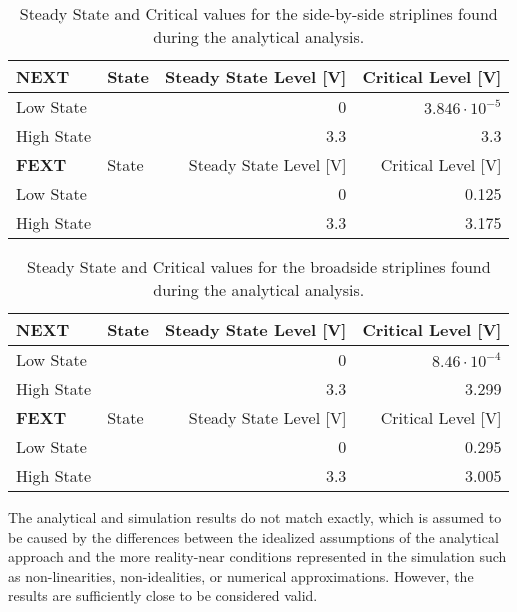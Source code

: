 \documentclass[../main.tex]{subfiles}
\begin{document}
\begin{table}[h]
    \centering
    \begin{tabular}{l l|r r}
        \toprule[1pt]
        \textbf{NEXT} & State & Steady State Level [V] & Critical Level [V] \\
        \midrule
        Low State & & 0 & $3.846 \cdot 10^{-5}$\\
        High State & & 3.3 & 3.3\\
        \midrule[1pt]
        \textbf{FEXT} & State & Steady State Level [V] & Critical Level [V] \\
        \midrule
        Low State & & 0 & 0.125\\
        High State & & 3.3 & 3.175\\
        \bottomrule[1pt]
    \end{tabular}
    \caption{Steady State and Critical values for the side-by-side striplines found during the analytical analysis.}
    \label{tab:analytical-sidebyside-stripline}
\end{table}

\begin{table}[h]
    \centering
    \begin{tabular}{l l|r r}
        \toprule[1pt]
        \textbf{NEXT} & State & Steady State Level [V] & Critical Level [V] \\
        \midrule
        Low State & & 0 & $8.46\cdot 10^{-4}$ \\
        High State & & 3.3 & 3.299\\
        \midrule[1pt]
        \textbf{FEXT} & State & Steady State Level [V] & Critical Level [V] \\
        \midrule
        Low State & & 0 &  0.295\\
        High State & & 3.3 & 3.005\\
        \bottomrule[1pt]
    \end{tabular}
    \caption{Steady State and Critical values for the broadside striplines found during the analytical analysis.}
    \label{tab:analytical-broadside-stripline}
\end{table}

The analytical and simulation results do not match exactly, which is assumed to be caused by the differences between the idealized assumptions of the analytical approach and the more reality-near conditions represented in the simulation such as non-linearities, non-idealities, or numerical approximations. However, the results are sufficiently close to be considered valid.
\end{document}
